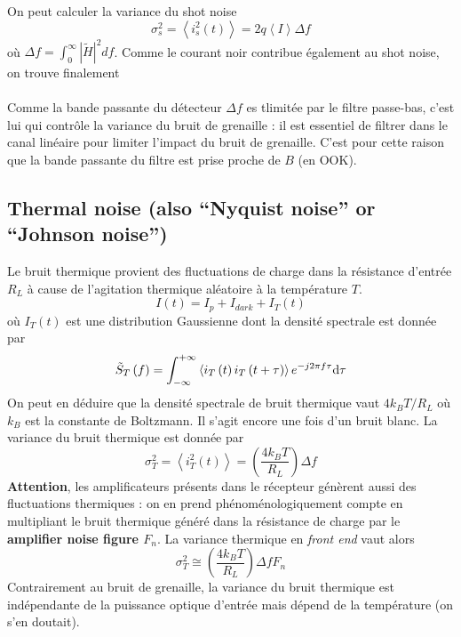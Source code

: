 On peut calculer la variance du shot noise
\begin{equation}
\sigma _s^2 = \left\langle {i_s^2\left( t \right)} \right\rangle  = 2q\left\langle I \right\rangle \Delta f
\end{equation}
où $\Delta f = \int_0^\infty  {{{\left| {\tilde H} \right|}^2}df}$. Comme le courant noir contribue
également au shot noise, on trouve finalement\\

\ \\


Comme la bande passante du détecteur $\Delta f$ es tlimitée par le filtre passe-bas, c'est lui 
qui contrôle la variance du bruit de grenaille : il est essentiel de filtrer dans le canal linéaire
pour limiter l'impact du bruit de grenaille. C'est pour cette raison que la bande passante du filtre
est prise proche de $B$ (en OOK).


\subsection{Thermal noise (also “Nyquist noise” or “Johnson noise”)}
Le bruit thermique provient des fluctuations de charge dans la résistance d'entrée $R_L$ à cause de 
l'agitation thermique aléatoire à la température $T$.
\begin{equation}
I(t) = I_p  + I_{dark} + I_T(t)
\end{equation}
où $I_T(t)$ est une distribution Gaussienne dont la densité spectrale est donnée par
\begin{equation}
{\tilde S_T}\left( f \right) = \int_{ - \infty }^{ + \infty } {\left\langle {{i_T}\left( t \right){i_T}\left( {t + \tau } \right)} \right\rangle {e^{ - j2\pi f\tau }}{\rm{d}}\tau } 
\end{equation}
On peut en déduire que la densité spectrale de bruit thermique vaut $4k_BT/R_L$ où $k_B$ est la 
constante de Boltzmann. Il s'agit encore une fois d'un bruit blanc. La variance du bruit thermique 
est donnée par
\begin{equation}
\sigma _T^2 = \left\langle {i_T^2\left( t \right)} \right\rangle  = \left( {\frac{{4{k_B}T}}{{{R_L}}}} \right)\Delta f
\end{equation}
\textbf{Attention}, les amplificateurs présents dans le récepteur génèrent aussi des fluctuations
thermiques : on en prend phénoménologiquement compte en multipliant le bruit thermique généré dans
la résistance de charge par le \textbf{amplifier noise figure $F_n$}. La variance thermique en \textit{front end} vaut alors
\begin{equation}
\sigma _T^2 \cong \left( {\frac{{4{k_B}T}}{{{R_L}}}} \right)\Delta f{F_n}
\end{equation}
Contrairement au bruit de grenaille, la variance du bruit thermique est indépendante de la puissance
optique d'entrée mais dépend de la température (on s'en doutait).

